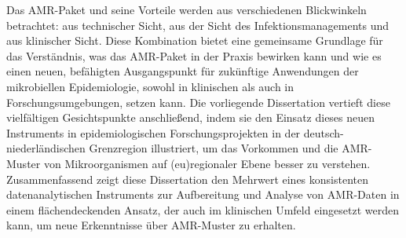 \documentclass[
]{book}
\begin{document}
Das AMR-Paket und seine Vorteile werden aus verschiedenen Blickwinkeln betrachtet: aus technischer Sicht, aus der Sicht des Infektionsmanagements und aus klinischer Sicht. Diese Kombination bietet eine gemeinsame Grundlage für das Verständnis, was das AMR-Paket in der Praxis bewirken kann und wie es einen neuen, befähigten Ausgangspunkt für zukünftige Anwendungen der mikrobiellen Epidemiologie, sowohl in klinischen als auch in Forschungsumgebungen, setzen kann. Die vorliegende Dissertation vertieft diese vielfältigen Gesichtspunkte anschließend, indem sie den Einsatz dieses neuen Instruments in epidemiologischen Forschungsprojekten in der deutsch-niederländischen Grenzregion illustriert, um das Vorkommen und die AMR-Muster von Mikroorganismen auf (eu)regionaler Ebene besser zu verstehen. Zusammenfassend zeigt diese Dissertation den Mehrwert eines konsistenten datenanalytischen Instruments zur Aufbereitung und Analyse von AMR-Daten in einem flächendeckenden Ansatz, der auch im klinischen Umfeld eingesetzt werden kann, um neue Erkenntnisse über AMR-Muster zu erhalten.

  
\end{document}
